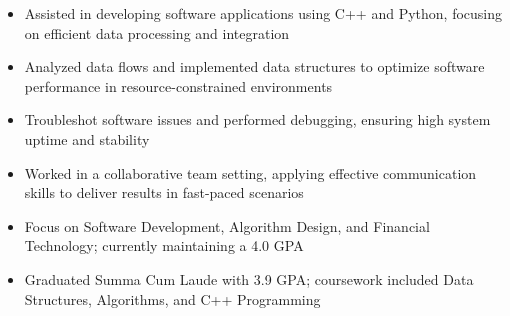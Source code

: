 \par\smallskip
\noindent
\begin{minipage}{20cm}
  \begin{minipage}{9.75cm}
    \begin{itemize}
      \item Assisted in developing software applications using C++ and Python, focusing on efficient data processing and integration
      \item Analyzed data flows and implemented data structures to optimize software performance in resource-constrained environments
    \end{itemize}
  \end{minipage}
  \hfill
  \begin{minipage}{9.75cm}
    \begin{itemize}
      \item Troubleshot software issues and performed debugging, ensuring high system uptime and stability
      \item Worked in a collaborative team setting, applying effective communication skills to deliver results in fast-paced scenarios
    \end{itemize}
  \end{minipage}
\end{minipage}

\begin{itemize}
  \item Focus on Software Development, Algorithm Design, and Financial Technology; currently maintaining a 4.0 GPA
\end{itemize}
\divider

\begin{itemize}
  \item Graduated Summa Cum Laude with 3.9 GPA; coursework included Data Structures, Algorithms, and C++ Programming
\end{itemize}

\noindent
\begin{minipage}{20cm}
     
     
    
\end{minipage}


